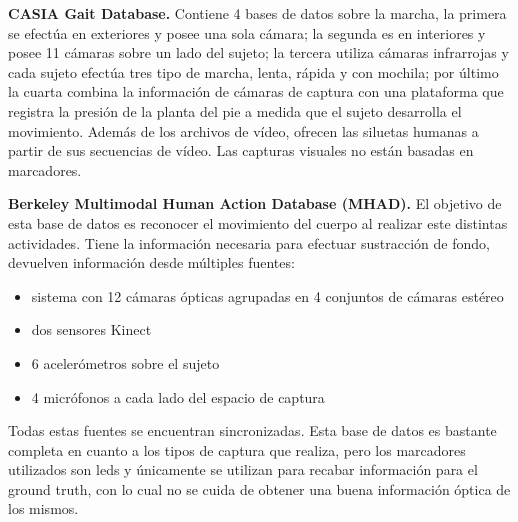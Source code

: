 \textbf{CASIA Gait Database.}
Contiene 4 bases de datos sobre la marcha, la primera se efectúa en exteriores y posee una sola cámara; la segunda es en interiores  y posee 11 cámaras sobre un lado del sujeto; la tercera utiliza cámaras infrarrojas y cada sujeto efectúa tres tipo de marcha, lenta, rápida y con mochila; por último la cuarta combina la información de cámaras de captura con una plataforma que registra la presión de la planta del pie a medida que el sujeto desarrolla el movimiento. Además de los archivos de vídeo, ofrecen las siluetas humanas a partir de sus secuencias de vídeo. Las capturas visuales no están basadas en marcadores.

\textbf{Berkeley Multimodal Human Action Database (MHAD).}
El objetivo de esta base de datos es reconocer el movimiento del cuerpo al realizar este distintas actividades. Tiene la información necesaria para efectuar sustracción de fondo, devuelven información desde múltiples fuentes:
\begin{itemize}
\item sistema con 12 cámaras ópticas agrupadas en 4 conjuntos de cámaras estéreo
\item dos sensores Kinect
\item 6 acelerómetros sobre el sujeto
\item 4 micrófonos a cada lado del espacio de captura
\end{itemize} Todas estas fuentes se encuentran sincronizadas. Esta base de datos es bastante completa en cuanto a los tipos de captura que realiza, pero los marcadores utilizados son leds y únicamente se utilizan para recabar información para el ground truth, con lo cual no se cuida de obtener una buena información óptica de los mismos. 



